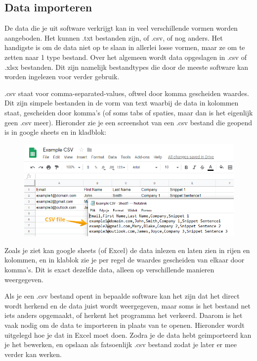 \subsection{Data importeren}

De data die je uit software verkrijgt kan in veel verschillende vormen worden aangeboden. Het kunnen .txt bestanden zijn, of .csv, of nog anders. Het handigste is om de data niet op te slaan in allerlei losse vormen, maar ze om te zetten naar 1 type bestand. Over het algemeen wordt data opgeslagen in .csv of .xlsx bestanden. Dit zijn namelijk bestandtypes die door de meeste software kan worden ingelezen voor verder gebruik.

.csv staat voor comma-separated-values, oftwel door komma gescheiden waardes. Dit zijn simpele bestanden in de vorm van text waarbij de data in kolommen staat, gescheiden door komma's (of soms tabs of spaties, maar dan is het eigenlijk geen .csv meer). Hieronder zie je een screenshot van een .csv bestand die geopend is in google sheets en in kladblok:

\begin{figure}[h]
\begin{center}
\includegraphics[width=\textwidth]{img/csv_ex.png}
\end{center}
\end{figure}

Zoals je ziet kan google sheets (of Excel) de data inlezen en laten zien in rijen en kolommen, en in klablok zie je per regel de waardes gescheiden van elkaar door komma's. Dit is exact dezelfde data, alleen op verschillende manieren weergegeven. 

Als je een .csv bestand opent in bepaalde software kan het zijn dat het direct wordt herkend en de data juist wordt weergegeven, maar soms is het bestand net iets anders opgemaakt, of herkent het programma het verkeerd. Daarom is het vaak nodig om de data te importeren in plaats van te openen. Hieronder wordt uitgelegd hoe je dat in Excel moet doen. Zodra je de data hebt geimporteerd kan je het bewerken, en opslaan als fatsoenlijk .csv bestand zodat je later er mee verder kan werken.

